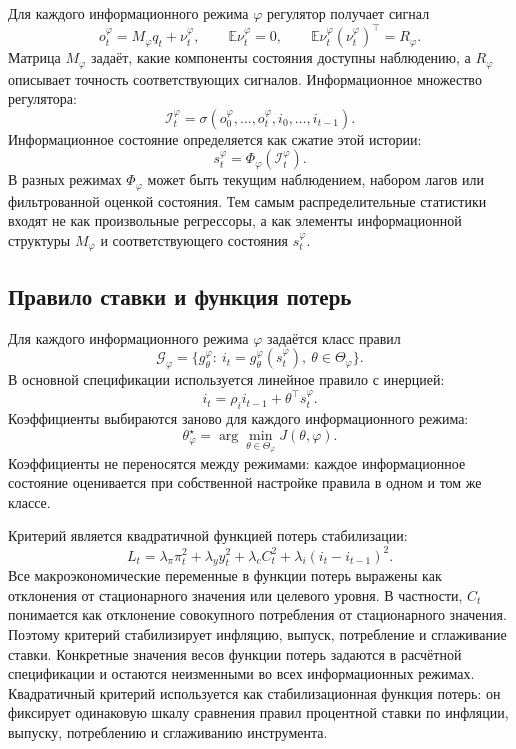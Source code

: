 Для каждого информационного режима \(\varphi\) регулятор получает сигнал
\[
o_t^\varphi
=
M_\varphi q_t+\nu_t^\varphi,
\qquad
\mathbb E\nu_t^\varphi=0,
\qquad
\mathbb E\nu_t^\varphi(\nu_t^\varphi)^{\top}=R_\varphi .
\]
Матрица \(M_\varphi\) задаёт, какие компоненты состояния доступны наблюдению, а \(R_\varphi\) описывает
точность соответствующих сигналов. Информационное множество регулятора:
\[
\mathcal I_t^\varphi
=
\sigma(o_0^\varphi,\ldots,o_t^\varphi,i_0,\ldots,i_{t-1}).
\]
Информационное состояние определяется как сжатие этой истории:
\[
s_t^\varphi
=
\Phi_\varphi(\mathcal I_t^\varphi).
\]
В разных режимах \(\Phi_\varphi\) может быть текущим наблюдением, набором лагов или фильтрованной
оценкой состояния. Тем самым распределительные статистики входят не как произвольные регрессоры,
а как элементы информационной структуры \(M_\varphi\) и соответствующего состояния \(s_t^\varphi\).

\subsection{Правило ставки и функция потерь}

Для каждого информационного режима \(\varphi\) задаётся класс правил
\[
\mathcal G_\varphi
=
\{g_\theta^\varphi:\ i_t=g_\theta^\varphi(s_t^\varphi),\ \theta\in\Theta_\varphi\}.
\]
В основной спецификации используется линейное правило с инерцией:
\[
i_t
=
\rho_i i_{t-1}+\theta^\top s_t^\varphi .
\]
Коэффициенты выбираются заново для каждого информационного режима:
\[
\theta_\varphi^\star
=
\arg\min_{\theta\in\Theta_\varphi}J(\theta,\varphi).
\]
Коэффициенты не переносятся между режимами: каждое информационное состояние оценивается при
собственной настройке правила в одном и том же классе.

Критерий является квадратичной функцией потерь стабилизации:
\[
L_t
=
\lambda_\pi \pi_t^2
+\lambda_y y_t^2
+\lambda_c C_t^2
+\lambda_i(i_t-i_{t-1})^2.
\]
Все макроэкономические переменные в функции потерь выражены как отклонения от стационарного
значения или целевого уровня. В частности, \(C_t\) понимается как отклонение совокупного
потребления от стационарного значения. Поэтому критерий стабилизирует инфляцию, выпуск,
потребление и сглаживание ставки. Конкретные значения весов функции потерь задаются в
расчётной спецификации и остаются неизменными во всех информационных режимах. Квадратичный
критерий используется как стабилизационная функция потерь: он фиксирует одинаковую шкалу
сравнения правил процентной ставки по инфляции, выпуску, потреблению и сглаживанию инструмента.

